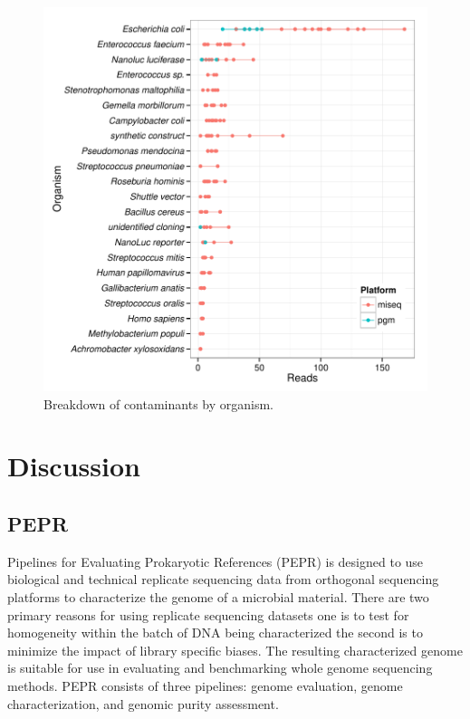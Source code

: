 \documentclass[smallextended]{svjour3}\usepackage[]{graphicx}\usepackage[]{color}
\makeatletter
\def\maxwidth{ %
  \ifdim\Gin@nat@width>\linewidth
    \linewidth
  \else
    \Gin@nat@width
  \fi
}
\newenvironment{knitrout}{}{} %
\makeatother
\begin{document}
\begin{knitrout}
\color{fgcolor}\begin{figure}

{\centering \includegraphics[width=\maxwidth]{figure/contamTaxaFig-1} 

}

\caption[Breakdown of contaminants by organism]{Breakdown of contaminants by organism.}\label{fig:contamTaxaFig}
\end{figure}


\end{knitrout}


\section{Discussion}
\subsection{PEPR}
Pipelines for Evaluating Prokaryotic References (PEPR) is designed to use biological and technical replicate sequencing data from orthogonal sequencing platforms to characterize the genome of a microbial material.  There are two primary reasons for using replicate sequencing datasets one is to test for homogeneity within the batch of DNA being characterized the second is to minimize the impact of library specific biases. The resulting characterized genome is suitable for use in evaluating and benchmarking whole genome sequencing methods. PEPR consists of three pipelines: genome evaluation, genome characterization, and genomic purity assessment.
\end{document}
